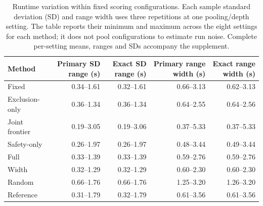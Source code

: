 \begin{table}[t]\centering\small
\begin{tabular}{lrrrr}\toprule
Method & Primary SD range (s) & Exact SD range (s) & Primary range width (s) & Exact range width (s)\\\midrule
Fixed & 0.34--1.61 & 0.32--1.61 & 0.66--3.13 & 0.62--3.13 \\
Exclusion-only & 0.36--1.34 & 0.36--1.34 & 0.64--2.55 & 0.64--2.56 \\
Joint frontier & 0.19--3.05 & 0.19--3.06 & 0.37--5.33 & 0.37--5.33 \\
Safety-only & 0.26--1.97 & 0.26--1.97 & 0.48--3.44 & 0.49--3.44 \\
Full & 0.33--1.39 & 0.33--1.39 & 0.59--2.76 & 0.59--2.76 \\
Width & 0.32--1.29 & 0.32--1.29 & 0.60--2.30 & 0.60--2.30 \\
Random & 0.66--1.76 & 0.66--1.76 & 1.25--3.20 & 1.26--3.20 \\
Reference & 0.31--1.79 & 0.32--1.79 & 0.61--3.56 & 0.61--3.56 \\
\bottomrule\end{tabular}
\caption{Runtime variation within fixed scoring configurations. Each sample standard deviation (SD) and range width uses three repetitions at one pooling/depth setting. The table reports their minimum and maximum across the eight settings for each method; it does not pool configurations to estimate run noise. Complete per-setting means, ranges and SDs accompany the supplement.}
\label{tab:runtime-variation}\end{table}
